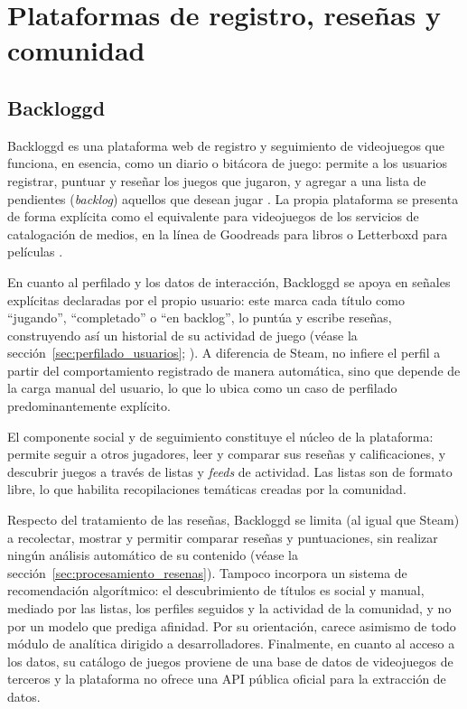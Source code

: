 \section{Plataformas de registro, reseñas y comunidad}\label{sec:plataformas_registro}

\subsection{Backloggd}\label{subsec:backloggd}

Backloggd es una plataforma web de registro y seguimiento de videojuegos que funciona, en esencia, como un diario o bitácora de juego: permite a los usuarios registrar, puntuar y reseñar los juegos que jugaron, y agregar a una lista de pendientes (\emph{backlog}) aquellos que desean jugar \parencite{Backloggd}. La propia plataforma se presenta de forma explícita como el equivalente para videojuegos de los servicios de catalogación de medios, en la línea de Goodreads para libros o Letterboxd para películas \parencite{Backloggd}.

En cuanto al perfilado y los datos de interacción, Backloggd se apoya en señales explícitas declaradas por el propio usuario: este marca cada título como \enquote{jugando}, \enquote{completado} o \enquote{en backlog}, lo puntúa y escribe reseñas, construyendo así un historial de su actividad de juego (véase la sección~\ref{sec:perfilado_usuarios}; \parencite{KanojeEtAl2014}). A diferencia de Steam, no infiere el perfil a partir del comportamiento registrado de manera automática, sino que depende de la carga manual del usuario, lo que lo ubica como un caso de perfilado predominantemente explícito.

El componente social y de seguimiento constituye el núcleo de la plataforma: permite seguir a otros jugadores, leer y comparar sus reseñas y calificaciones, y descubrir juegos a través de listas y \emph{feeds} de actividad. Las listas son de formato libre, lo que habilita recopilaciones temáticas creadas por la comunidad.

Respecto del tratamiento de las reseñas, Backloggd se limita (al igual que Steam) a recolectar, mostrar y permitir comparar reseñas y puntuaciones, sin realizar ningún análisis automático de su contenido (véase la sección~\ref{sec:procesamiento_resenas}). Tampoco incorpora un sistema de recomendación algorítmico: el descubrimiento de títulos es social y manual, mediado por las listas, los perfiles seguidos y la actividad de la comunidad, y no por un modelo que prediga afinidad. Por su orientación, carece asimismo de todo módulo de analítica dirigido a desarrolladores. Finalmente, en cuanto al acceso a los datos, su catálogo de juegos proviene de una base de datos de videojuegos de terceros y la plataforma no ofrece una API pública oficial para la extracción de datos.

